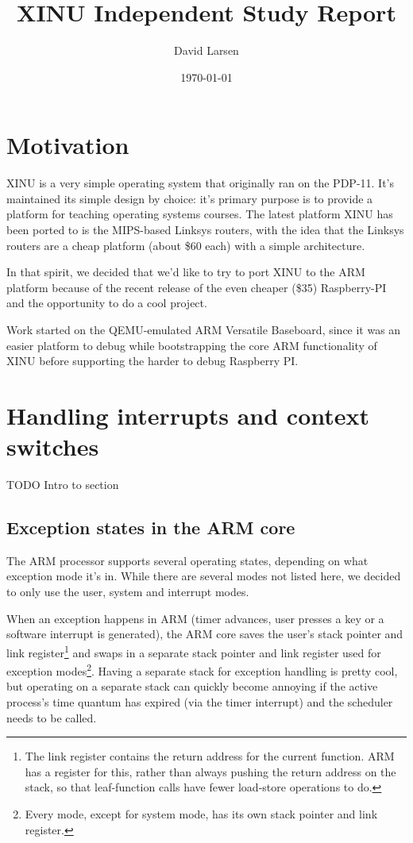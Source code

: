 \documentclass[12pt]{article}
\title{XINU Independent Study Report}
\author{David Larsen}
\date{\today}
\newcommand{\TODO}[1]{{\huge\color{red}TODO \Large #1}}
\begin{document}
\maketitle

\tableofcontents

\section{Motivation}

XINU is a very simple operating system that originally ran on the PDP-11. It's
maintained its simple design by choice: it's primary purpose is to provide a
platform for teaching operating systems courses. The latest platform XINU has
been ported to is the MIPS-based Linksys routers, with the idea that the
Linksys routers are a cheap platform (about \$60 each) with a simple
architecture.

In that spirit, we decided that we'd like to try to port XINU to the ARM
platform because of the recent release of the even cheaper (\$35) Raspberry-PI
and the opportunity to do a cool project.

Work started on the QEMU-emulated ARM Versatile Baseboard, since it was an
easier platform to debug while bootstrapping the core ARM functionality of XINU
before supporting the harder to debug Raspberry PI.

\section{Handling interrupts and context switches}

\TODO{Intro to section}

\subsection{Exception states in the ARM core}

The ARM processor supports several operating states, depending on what
exception mode it's in. While there are several modes not listed here, we
decided to only use the user, system and interrupt modes.

When an exception happens in ARM (timer advances, user presses a key or a
software interrupt is generated), the ARM core saves the user's stack pointer
and link register\footnote{The link register contains the return address for
the current function. ARM has a register for this, rather than always pushing
the return address on the stack, so that leaf-function calls have fewer
load-store operations to do.} and swaps in a separate stack pointer and link
register used for exception modes\footnote{Every mode, except for system mode,
has its own stack pointer and link register.}. Having a separate stack for
exception handling is pretty cool, but operating on a separate stack can
quickly become annoying if the active process's time quantum has expired (via
the timer interrupt) and the scheduler needs to be called.
\end{document}
